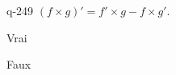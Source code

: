\begin{truefalse}{q-249}
$(f\times g)' = f'\times g - f\times g'$.
\item Vrai
\item* Faux
\end{truefalse}


